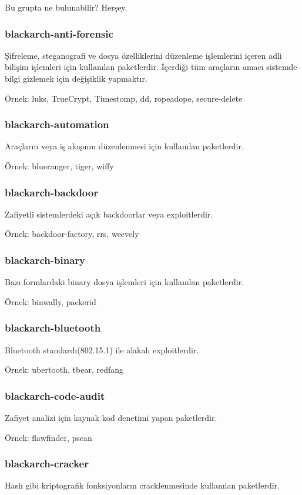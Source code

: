 \documentclass[a4paper, oneside, 11pt]{book}
\begin{document}
Bu grupta ne bulunabilir? Herşey.

\subsubsection{blackarch-anti-forensic}
Şifreleme, steganografi ve dosya özelliklerini düzenleme işlemlerini içeren adli bilişim işlemleri için kullanılan paketlerdir. 
İçerdiği tüm araçların amacı sistemde bilgi gizlemek için değişiklik yapmaktır.

Örnek: luks, TrueCrypt, Timestomp, dd, ropeadope, secure-delete

\subsubsection{blackarch-automation}
Araçların veya iş akışının düzenlenmesi için kullanılan paketlerdir.

Örnek: blueranger, tiger, wiffy

\subsubsection{blackarch-backdoor}
Zafiyetli sistemlerdeki açık backdoorlar veya exploitlerdir.

Örnek: backdoor-factory, rrs, weevely

\subsubsection{blackarch-binary}
Bazı formlardaki binary dosya işlemleri için kullanılan paketlerdir.

Örnek: binwally, packerid

\subsubsection{blackarch-bluetooth}
Bluetooth standardı(802.15.1) ile alakalı exploitlerdir.

Örnek: ubertooth, tbear, redfang

\subsubsection{blackarch-code-audit}
Zafiyet analizi için kaynak kod denetimi yapan paketlerdir.

Örnek: flawfinder, pscan

\subsubsection{blackarch-cracker}
Hash gibi kriptografik fonksiyonların cracklenmesinde kullanılan paketlerdir.
\end{document}
